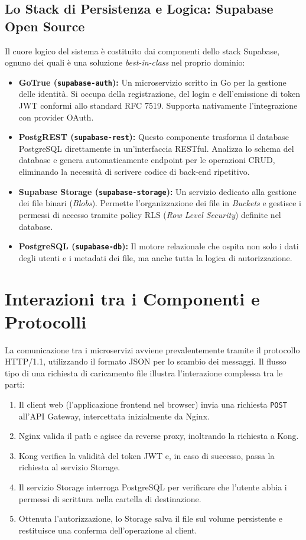 \documentclass[12pt,a4paper]{report}
\begin{document}
\subsection{Lo Stack di Persistenza e Logica: Supabase Open Source}
Il cuore logico del sistema è costituito dai componenti dello stack Supabase,
ognuno dei quali è una soluzione \textit{best-in-class} nel proprio dominio:
\begin{itemize}
  \item \textbf{GoTrue (\texttt{supabase-auth}):} Un microservizio scritto in
    Go per la gestione delle identità. Si occupa della registrazione, del login
    e dell'emissione di token JWT conformi allo standard RFC 7519. Supporta
    nativamente l'integrazione con provider OAuth.
  \item \textbf{PostgREST (\texttt{supabase-rest}):} Questo componente
    trasforma il database PostgreSQL direttamente in un'interfaccia RESTful.
    Analizza lo schema del database e genera automaticamente endpoint per le
    operazioni CRUD, eliminando la necessità di scrivere codice di back-end
    ripetitivo.
  \item \textbf{Supabase Storage (\texttt{supabase-storage}):} Un servizio
    dedicato alla gestione dei file binari (\textit{Blobs}). Permette
    l'organizzazione dei file in \textit{Buckets} e gestisce i permessi di
    accesso tramite policy RLS (\textit{Row Level Security}) definite nel
    database.
  \item \textbf{PostgreSQL (\texttt{supabase-db}):} Il motore relazionale
    che ospita non solo i dati degli utenti e i metadati dei file, ma anche
    tutta la logica di autorizzazione.
\end{itemize}

\section{Interazioni tra i Componenti e Protocolli}
La comunicazione tra i microservizi avviene prevalentemente tramite
il protocollo \newline HTTP/1.1, utilizzando il formato JSON per lo scambio
dei messaggi. Il flusso tipo di una richiesta di caricamento file
illustra l'interazione complessa tra le parti:
\begin{enumerate}
  \item Il client web (l'applicazione frontend nel browser) invia una
    richiesta \texttt{POST} all'API Gateway, intercettata inizialmente da Nginx.
  \item Nginx valida il path e agisce da reverse proxy, inoltrando la
    richiesta a Kong.
  \item Kong verifica la validità del token JWT e, in caso di
    successo, passa la richiesta al servizio Storage.
  \item Il servizio Storage interroga PostgreSQL per verificare che l'utente
    abbia i permessi di scrittura nella cartella di destinazione.
  \item Ottenuta l'autorizzazione, lo Storage salva il file sul
    volume persistente e restituisce una conferma dell'operazione al client.
\end{enumerate}
\end{document}
